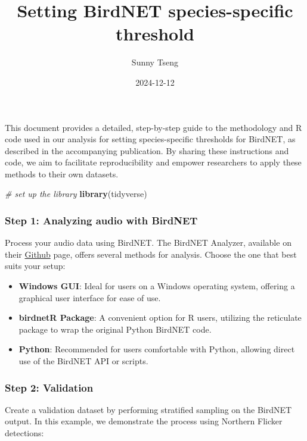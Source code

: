 \documentclass[
]{article}
\title{Setting BirdNET species-specific threshold}
\author{Sunny Tseng}
\date{2024-12-12}
\newenvironment{Shaded}{\begin{snugshade}}{\end{snugshade}}
\newcommand{\CommentTok}[1]{\textcolor[rgb]{0.56,0.35,0.01}{\textit{#1}}}
\newcommand{\FunctionTok}[1]{\textcolor[rgb]{0.13,0.29,0.53}{\textbf{#1}}}
\newcommand{\NormalTok}[1]{#1}
\begin{document}
\maketitle

This document provides a detailed, step-by-step guide to the methodology
and R code used in our analysis for setting species-specific thresholds
for BirdNET, as described in the accompanying publication. By sharing
these instructions and code, we aim to facilitate reproducibility and
empower researchers to apply these methods to their own datasets.

\begin{Shaded}
\begin{Highlighting}[]
\CommentTok{\# set up the library}
\FunctionTok{library}\NormalTok{(tidyverse)}
\end{Highlighting}
\end{Shaded}

\subsubsection{Step 1: Analyzing audio with
BirdNET}\label{step-1-analyzing-audio-with-birdnet}

Process your audio data using BirdNET. The BirdNET Analyzer, available
on their \href{https://github.com/kahst/BirdNET-Analyzer}{Github} page,
offers several methods for analysis. Choose the one that best suits your
setup:

\begin{itemize}
\item
  \textbf{Windows GUI}: Ideal for users on a Windows operating system,
  offering a graphical user interface for ease of use.
\item
  \textbf{birdnetR Package}: A convenient option for R users, utilizing
  the reticulate package to wrap the original Python BirdNET code.
\item
  \textbf{Python}: Recommended for users comfortable with Python,
  allowing direct use of the BirdNET API or scripts.
\end{itemize}

\subsubsection{Step 2: Validation}\label{step-2-validation}

Create a validation dataset by performing stratified sampling on the
BirdNET output. In this example, we demonstrate the process using
Northern Flicker detections:
\end{document}
